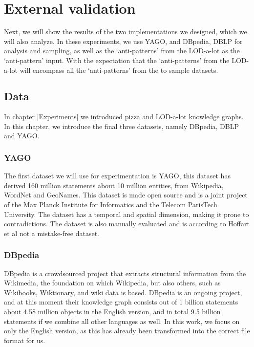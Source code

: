 \documentclass[11pt,letterpaper ,oneside ]{book}
\begin{document}
	\newpage
	\chapter{External validation}\label{externalvalidation}
	Next, we will show the results of the two implementations we designed, which we will also analyze. In these experiments, we use YAGO, and DBpedia, DBLP for analysis and sampling, as well as the `anti-patterns' from the LOD-a-lot as the `anti-pattern' input. With the expectation that the `anti-patterns' from the LOD-a-lot will encompass all the `anti-patterns' from the to sample datasets.\\
	
	\section{Data}
	In chapter \ref{Experiments} we introduced pizza and LOD-a-lot knowledge graphs. In this chapter, we introduce the final three datasets, namely DBpedia, DBLP and YAGO.
	
	\subsection{YAGO}
	The first dataset we will use for experimentation is YAGO\cite{YAGO2:2013}, this dataset has derived 160 million statements about 10 million entities, from Wikipedia, WordNet and GeoNames. This dataset is made open source and is a joint project of the Max Planck Institute for Informatics and the Telecom ParisTech University. The dataset has a temporal and spatial dimension, making it prone to contradictions. The dataset is also manually evaluated and is according to Hoffart et al\cite{YAGO2:2013} not a mistake-free dataset.
	
	\subsection{DBpedia}
	DBpedia\cite{DBpedia} is a crowdsourced project that extracts structural information from the Wikimedia, the foundation on which Wikipedia, but also others, such as Wikibooks, Wiktionary, and wiki data is based. DBpedia is an ongoing project, and at this moment their knowledge graph consists out of 1 billion statements about 4.58 million objects in the English version, and in total 9.5 billion statements if we combine all other languages as well. In this work, we focus on only the English version, as this has already been transformed into the correct file format for us. 
	
\end{document}
